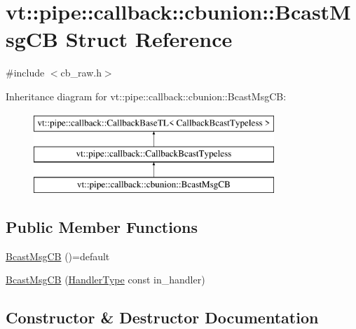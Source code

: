 \hypertarget{structvt_1_1pipe_1_1callback_1_1cbunion_1_1_bcast_msg_c_b}{}\section{vt\+:\+:pipe\+:\+:callback\+:\+:cbunion\+:\+:Bcast\+Msg\+CB Struct Reference}
\label{structvt_1_1pipe_1_1callback_1_1cbunion_1_1_bcast_msg_c_b}


{\ttfamily \#include $<$cb\+\_\+raw.\+h$>$}

Inheritance diagram for vt\+:\+:pipe\+:\+:callback\+:\+:cbunion\+:\+:Bcast\+Msg\+CB\+:\begin{figure}[H]
\begin{center}
\leavevmode
\includegraphics[height=3.000000cm]{structvt_1_1pipe_1_1callback_1_1cbunion_1_1_bcast_msg_c_b}
\end{center}
\end{figure}
\subsection*{Public Member Functions}
\begin{DoxyCompactItemize}
\item 
\hyperlink{structvt_1_1pipe_1_1callback_1_1cbunion_1_1_bcast_msg_c_b_a8fa08a4758e1d59288d60b55230c9fe5}{Bcast\+Msg\+CB} ()=default
\item 
\hyperlink{structvt_1_1pipe_1_1callback_1_1cbunion_1_1_bcast_msg_c_b_a4de829ac98c8ed02f2f4174b31e86345}{Bcast\+Msg\+CB} (\hyperlink{namespacevt_af64846b57dfcaf104da3ef6967917573}{Handler\+Type} const in\+\_\+handler)
\end{DoxyCompactItemize}


\subsection{Constructor \& Destructor Documentation}
\mbox{\label{structvt_1_1pipe_1_1callback_1_1cbunion_1_1_bcast_msg_c_b_a8fa08a4758e1d59288d60b55230c9fe5}} 
